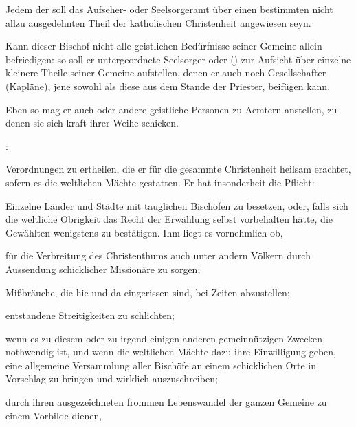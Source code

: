 \begin{aufza}
\begin{aufzb}
\item Jedem der  soll das Aufseher- oder Seelsorgeramt über einen bestimmten nicht allzu ausgedehnten Theil der katholischen Christenheit angewiesen seyn.~
\item Kann dieser Bischof nicht alle geistlichen Bedürfnisse seiner Gemeine allein befriedigen: so soll er untergeordnete Seelsorger oder  () zur Aufsicht über einzelne kleinere Theile seiner Gemeine aufstellen, denen er auch noch Gesellschafter (Kapläne), jene sowohl als diese aus dem Stande der Priester, beifügen kann.
\item Eben so mag er auch  oder andere geistliche Personen zu Aemtern anstellen, zu denen sie sich kraft ihrer Weihe schicken.
\end{aufzb}
\item {}:
\begin{aufzb}
\item Verordnungen zu ertheilen, die er für die gesammte Christenheit heilsam erachtet, sofern es die weltlichen Mächte gestatten. Er hat insonderheit die Pflicht:
\item Einzelne Länder und Städte mit tauglichen Bischöfen zu besetzen, oder, falls sich die weltliche Obrigkeit das Recht der Erwählung selbst vorbehalten hätte, die Gewählten wenigstens zu bestätigen. Ihm liegt es vornehmlich ob,
\item für die Verbreitung des Christenthums auch unter andern Völkern durch Aussendung schicklicher Missionäre zu sorgen;
\item Mißbräuche, die hie und da eingerissen sind, bei Zeiten abzustellen;
\item entstandene Streitigkeiten zu schlichten;
\item wenn es zu diesem oder zu irgend einigen anderen gemeinnützigen Zwecken nothwendig ist, und wenn die weltlichen Mächte dazu ihre Einwilligung geben, eine allgemeine Versammlung aller Bischöfe an einem schicklichen Orte in Vorschlag zu bringen und wirklich auszuschreiben; \usw\
\end{aufzb}
\item {}
\begin{aufzb}
\item durch ihren ausgezeichneten frommen Lebenswandel der ganzen Gemeine zu einem Vorbilde dienen,

\end{aufzb}
\end{aufza}
